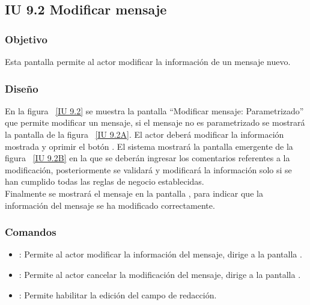 \subsection{IU 9.2 Modificar mensaje}

\subsubsection{Objetivo}
	
	Esta pantalla permite al actor modificar la información de un mensaje nuevo.

\subsubsection{Diseño}

    En la figura ~\ref{IU 9.2} se muestra la pantalla ``Modificar mensaje: Parametrizado'' que permite modificar un mensaje, si el mensaje no es parametrizado se mostrará la pantalla de la figura ~\ref{IU 9.2A}. El actor deberá modificar la información mostrada y oprimir el botón . El sistema mostrará la pantalla emergente de la figura ~\ref{IU 9.2B} en la que se deberán ingresar los comentarios referentes a la modificación, posteriormente se validará y modificará la información solo si se han cumplido todas las reglas de negocio establecidas. \\
    
    Finalmente se mostrará el mensaje  en la pantalla , para indicar que la información del mensaje
    se ha modificado correctamente.        

	

\subsubsection{Comandos}
\begin{itemize}
	\item {}: Permite al actor modificar la información del mensaje, dirige a la pantalla .
	\item {}: Permite al actor cancelar la modificación del mensaje, dirige a la pantalla .
	\item \btnEditar: Permite habilitar la edición del campo de redacción.
	
\end{itemize}

